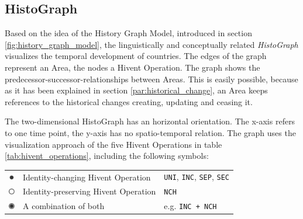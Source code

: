 
\subsection{HistoGraph} %
\label{sub:histograph}

Based on the idea of the History Graph Model, introduced in section \ref{fig:history_graph_model}, the linguistically and conceptually related \emph{HistoGraph} visualizes the temporal development of countries. The edges of the graph represent an Area, the nodes a Hivent Operation. The graph shows the predecessor-successor-relationships between Areas. This is easily possible, because as it has been explained in section \ref{par:historical_change}, an Area keeps references to the historical changes creating, updating and ceasing it.

The two-dimensional HistoGraph has an horizontal orientation. The x-axis refers to one time point, the y-axis has no spatio-temporal relation. The graph uses the visualization approach of the five Hivent Operations in table \ref{tab:hivent_operations}, including the following symbols:

\begin{table}[H]
\begin{center}
\begin{tabular}{c l l}

  \raisebox{3.5\height}

  \raisebox{-0.2\height}
  {\includegraphics[width=10px]{graphics/development/hivent_model/histograph/circle_filled}}
  & Identity-changing Hivent Operation
  & \texttt{UNI}, \texttt{INC}, \texttt{SEP}, \texttt{SEC} \\

  \raisebox{-0.2\height}
  {\includegraphics[width=10px]{graphics/development/hivent_model/histograph/circle_unfilled}}
  & Identity-preserving Hivent Operation
  & \texttt{NCH} \\

  \raisebox{-0.2\height}
  {\includegraphics[width=10px]{graphics/development/hivent_model/histograph/circle_combo}}
  & A combination of both
  & e.g. \texttt{INC + NCH}

\end{tabular}
\label{tab:histograph_symbols}
\end{center}
\end{table}

